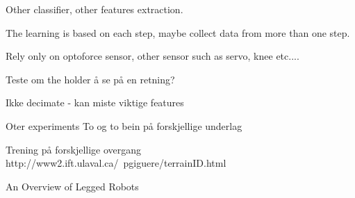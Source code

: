 \documentclass[USenglish]{ifimaster}  %
\begin{document}
Other classifier, other features extraction.

The learning is based on each step, maybe collect data from more than one step.

Rely only on optoforce sensor, other sensor such as servo, knee etc....

Teste om the holder å se på en retning?

Ikke decimate - kan miste viktige features

Oter experiments
To og to bein på forskjellige underlag

Trening på forskjellige overgang
http://www2.ift.ulaval.ca/~pgiguere/terrainID.html


An Overview of Legged Robots

\backmatter{}


\end{document}
